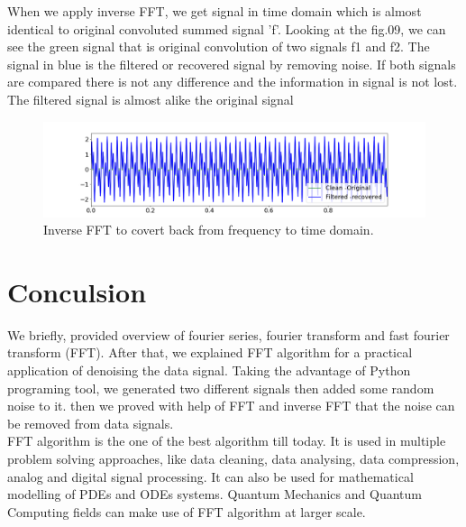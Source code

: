 \documentclass[a4paper, 12pt]{scrartcl}
\begin{document}
    When we apply inverse FFT, we get signal in time domain which is almost identical to original convoluted summed signal 'f'.
Looking at the fig.09, we can see the green signal that is original convolution of two signals f1 and f2. 
The signal in blue is the filtered or recovered signal by removing noise. If both signals are compared there is not any difference and the information in signal is not lost. 
The filtered signal is almost alike the original signal 
\begin{figure}[H] 
  \centering
  \includegraphics[width=\textwidth]{img/fft_infft_signals.png}
  \caption{Inverse FFT to covert back from frequency to time domain.}
  \label{fig:fft_infft_signals}
\end{figure}

\section{Conculsion}
We briefly, provided overview of fourier series, fourier transform and fast fourier transform (FFT). 
After that, we explained FFT algorithm for a practical application of denoising the data signal. Taking the advantage of Python programing tool, we generated two different signals then added some random noise to it.
then we proved with help of FFT and inverse FFT that the noise can be removed from data signals.\\
FFT algorithm is the one of the best algorithm till today. 
It is used in multiple problem solving approaches, like data cleaning, data analysing, data compression, analog and digital signal processing. It can also be used for mathematical modelling of PDEs and ODEs systems.
Quantum Mechanics and Quantum Computing fields can make use of FFT algorithm at larger scale.

    \newpage


  
\end{document}
